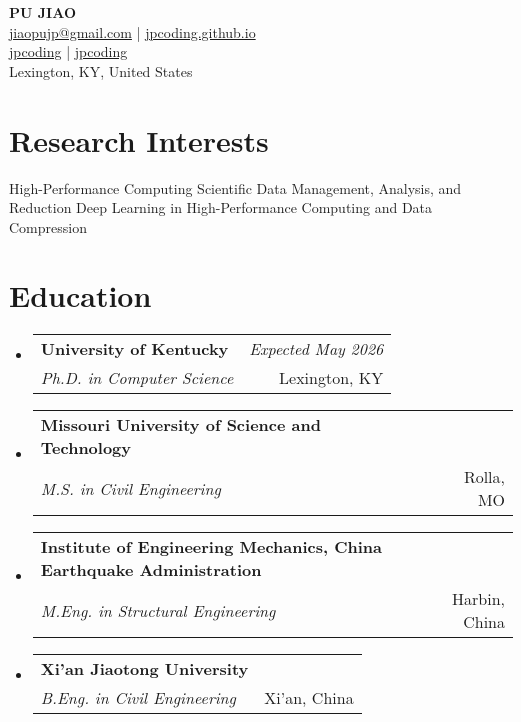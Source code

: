 \documentclass[a4paper,11pt]{article}
\makeatletter
\newcommand{\resumeSubheading}[4]{
\vspace{0.5mm}\item
    \begin{tabular*}{0.98\textwidth}[t]{l@{\extracolsep{\fill}}r}
        \textbf{#1} & \textit{\footnotesize{#4}} \\
        \textit{\footnotesize{#3}} &  \footnotesize{#2}\\
    \end{tabular*}
    \vspace{-2.4mm}
}
\newcommand{\resumeSubHeadingListStart}{\begin{itemize}[leftmargin=*,labelsep=1mm]}
\newcommand{\resumeSubHeadingListEnd}{\end{itemize}\vspace{2mm}}
\newcommand{\socialicon}[1]{\raisebox{-0.05em}{\resizebox{!}{1em}{#1}}}
\newcommand{\headerfontiii}{\fontfamily{ppl}\selectfont} %
\makeatother
\begin{document}
\headerfontiii

\begin{center}
    {\Huge\textbf{PU JIAO}}\\[0.5em]
    \small{
    \href{mailto:jiaopujp@gmail.com}{jiaopujp@gmail.com} | 
    \href{https://jpcoding.github.io/}{jpcoding.github.io}
    }\\[0.3em]
    \small{
    \socialicon{\faLinkedin} \href{https://www.linkedin.com/in/jpcoding}{jpcoding} | 
    \socialicon{\faGithub} \href{https://github.com/jpcoding}{jpcoding}
    }\\[0.2em]
    \small{Lexington, KY, United States}
\end{center}

\vspace{-4mm}

\section{\textbf{Research Interests}}
\vspace{-0.4mm}
\small{
High-Performance Computing 
Scientific Data Management, Analysis, and Reduction 
Deep Learning in High-Performance Computing and Data Compression
}
\vspace{-2mm}

\section{\textbf{Education}}
\vspace{-0.4mm}
\resumeSubHeadingListStart

\resumeSubheading
{University of Kentucky}{Lexington, KY}
{Ph.D. in Computer Science}{Expected May 2026}

\resumeSubheading
{Missouri University of Science and Technology}{Rolla, MO}
{M.S. in Civil Engineering}{}

\resumeSubheading
{Institute of Engineering Mechanics, China Earthquake Administration}{Harbin, China}
{M.Eng. in Structural Engineering}{}

\resumeSubheading
{Xi'an Jiaotong University}{Xi'an, China}
{B.Eng. in Civil Engineering}{}

\resumeSubHeadingListEnd
\vspace{-6mm}
\end{document}

